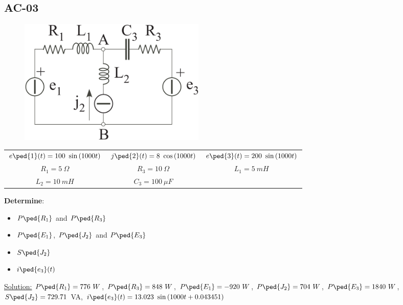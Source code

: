 \subsection{AC-03}
\begin{figure}[h]
\includegraphics[height=6cm]{img/2/03.png}
\centering
\end{figure}
\begin{center}
\begin{tabular}{ c c c }
    $e\ped{1}(t) = 100\ \sin{(1000t)}$ & $j\ped{2}(t) = 8\ \cos{(1000t)}$ & $e\ped{3}(t) = 200\ \sin{(1000t)}$\\
    $R_1 = 5\ \Omega$ & $R_3 = 10\ \Omega$ & $L_1 = 5\ mH$ \\
    $L_2 = 10\ mH$ & $C_3 = 100\ \mu F$
\end{tabular}
\end{center}
\textbf{Determine}:
\begin{itemize}
  \item $P\ped{R_1}$ and $P\ped{R_3}$
  \item $P\ped{E_1}$, $P\ped{J_2}$ and $P\ped{E_3}$ 
  \item $S\ped{J_2}$ 
  \item $i\ped{e_3}(t)$
\end{itemize}
\underline{\large{Solution:}}
\newline
$P\ped{R_1} = 776\ W$, $P\ped{R_3} = 848\ W$, $P\ped{E_1} = -920\ W$, $P\ped{J_2} = 704\ W$, $P\ped{E_3} = 1840\ W$, $S\ped{J_2} = 729.71\ $VA, $i\ped{e_3}(t) = 13.023\ \sin{(1000t + 0.043451 )}$
\newpage
